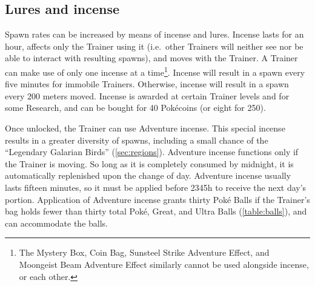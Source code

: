 \subsection{Lures and incense\label{subsec:lures}}
Spawn rates can be increased by means of incense and lures.
Incense lasts for an hour, affects only the Trainer using it (i.e.\ other Trainers
  will neither see nor be able to interact with resulting spawns),
  and moves with the Trainer.
A Trainer can make use of only one incense at a time\footnote{The
  Mystery Box, Coin Bag, Sunsteel Strike Adventure Effect, and
  Moongeist Beam Adventure Effect similarly cannot be used
  alongside incense, or each other.}.
Incense will result in a spawn every five minutes for immobile Trainers.
Otherwise, incense will result in a spawn every 200 meters moved.
Incense is awarded at certain Trainer levels and for some Research,
  and can be bought for 40 Pokécoins (or eight for 250).

Once unlocked, the Trainer can use Adventure incense.
This special incense results in a greater diversity of spawns, including
  a small chance of the ``Legendary Galarian Birds'' (\autoref{sec:regions}).
Adventure incense functions only if the Trainer is moving.
So long as it is completely consumed by midnight, it is automatically replenished
  upon the change of day.
Adventure incense usually lasts fifteen minutes, so it must be applied before 2345h
  to receive the next day's portion.
Application of Adventure incense grants thirty Poké Balls if the Trainer's
  bag holds fewer than thirty total Poké, Great, and Ultra Balls (\autoref{table:balls}),
  and can accommodate the balls.

